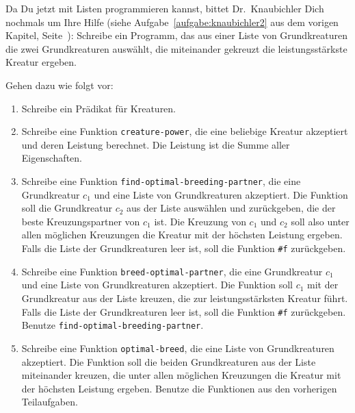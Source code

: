 \begin{aufgabe}
  Da Du jetzt mit Listen programmieren kannst, bittet Dr.~Knaubichler
  Dich nochmals um Ihre Hilfe (siehe Aufgabe~\ref{aufgabe:knaubichler2}
  aus dem vorigen Kapitel, Seite~\pageref{aufgabe:knaubichler2}):
  Schreibe ein Programm, das aus einer Liste von Grundkreaturen
  die zwei Grundkreaturen auswählt, die miteinander gekreuzt die
  leistungsstärkste Kreatur ergeben.

  Gehen dazu wie folgt vor:

  \begin{enumerate}
  \item Schreibe ein Prädikat für Kreaturen.

  \item Schreibe eine Funktion
    \texttt{creature-power}, die eine beliebige Kreatur akzeptiert und
    deren Leistung berechnet.  Die Leistung ist die Summe aller
    Eigenschaften.

  \item  Schreibe eine Funktion
    \texttt{find-optimal-breeding-partner}, die eine Grundkreatur
    $c_1$ und eine Liste von Grundkreaturen akzeptiert.  Die Funktion
    soll die Grundkreatur $c_2$ aus der Liste auswählen und
    zurückgeben, die der beste Kreuzungspartner von $c_1$ ist.  Die
    Kreuzung von $c_1$ und $c_2$ soll also unter allen möglichen
    Kreuzungen die Kreatur mit der höchsten Leistung ergeben.  Falls
    die Liste der Grundkreaturen leer ist, soll die Funktion \verb|#f|
    zurückgeben.

  \item  Schreibe eine Funktion
    \texttt{breed-optimal-partner}, die eine Grundkreatur $c_1$ und
    eine Liste von Grundkreaturen akzeptiert.  Die Funktion soll $c_1$
    mit der Grundkreatur aus der Liste kreuzen, die zur
    leistungsstärksten Kreatur führt.  Falls die Liste der
    Grundkreaturen leer ist, soll die Funktion \verb|#f| zurückgeben.
    Benutze \texttt{find-optimal-breeding-partner}.

  \item  Schreibe eine Funktion
    \texttt{optimal-breed}, die eine Liste von Grundkreaturen
    akzeptiert.  Die Funktion soll die beiden Grundkreaturen aus der
    Liste miteinander kreuzen, die unter allen möglichen Kreuzungen
    die Kreatur mit der höchsten Leistung ergeben.  Benutze die
    Funktionen aus den vorherigen Teilaufgaben.

  \end{enumerate}
\end{aufgabe}

